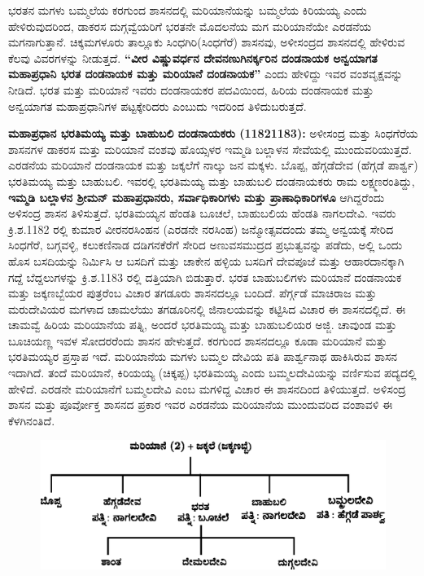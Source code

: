 ಭರತನ ಮಗಳು ಬಮ್ಮಲೆಯ ಕರಗುಂದ ಶಾಸನದಲ್ಲಿ ಮರಿಯಾನೆಯನ್ನು ಬಮ್ಮಲೆಯ ಕಿರಿಯಯ್ಯ ಎಂದು ಹೇಳಿರುವುದರಿಂದ, ಡಾಕರಸ ದುಗ್ಗವ್ವೆಯರಿಗೆ ಭರತನೇ ಮೊದಲನೆಯ ಮಗ ಮರಿಯಾನೆಯೇ ಎರಡನೆಯ ಮಗನಾಗುತ್ತಾನೆ. ಚಿಕ್ಕಮಗಳೂರು ತಾಲ್ಲೂಕು ಸಿಂಧಗಿರಿ(ಸಿಂಧಗೆರೆ) ಶಾಸನವು, ಅಳೀಸಂದ್ರದ ಶಾಸನದಲ್ಲಿ ಹೇಳಿರುವ ಕೆಲವು ವಿವರಗಳನ್ನು ನೀಡುತ್ತದೆ. \textbf{“ವೀರ ವಿಷ್ಣುವರ್ಧನ ದೇವನಣುಗಿನರ್ಕ್ಕರಿನ ದಂಡನಾಯಕ ಅನ್ವಯಾಗತ ಮಹಾಪ್ರಧಾನಿ ಭರತ ದಂಡನಾಯಕ ಮತ್ತು ಮರಿಯಾನೆ ದಂಡನಾಯಕ”} ಎಂದು ಹೇಳಿದ್ದು ಇವರ ವಂಶವೃಕ್ಷವನ್ನು ನೀಡಿದೆ. ಭರತ ಮತ್ತು ಮರಿಯಾನೆ ಇವರು ದಂಡನಾಯಕರ ಪದವಿಯಿಂದ, ಹಿರಿಯ ದಂಡನಾಯಕ ಮತ್ತು ಅನ್ವಯಾಗತ ಮಹಾಪ್ರಧಾನಿಗಳ ಪಟ್ಟಕ್ಕೇರಿದರು ಎಂಬುದು ಇದರಿಂದ ತಿಳಿದುಬರುತ್ತದೆ.

\textbf{ಮಹಾಪ್ರಧಾನ ಭರತಿಮಯ್ಯ ಮತ್ತು ಬಾಹುಬಲಿ ದಂಡನಾಯಕರು (1182\general{\enginline{-}}1183): }ಅಳೀಸಂದ್ರ ಮತ್ತು ಸಿಂಧಗೆರೆಯ ಶಾಸನಗಳ ಡಾಕರಸ ಮತ್ತು ಮರಿಯಾನೆ ವಂಶವು ಹೊಯ್ಸಳರ ಇಮ್ಮಡಿ ಬಲ್ಲಾಳನ ಸೇವೆಯಲ್ಲಿ ಮುಂದುವರಿ\-ಯುತ್ತದೆ. ಎರಡನೆಯ ಮರಿಯಾನೆ ದಂಡನಾಯಕ ಮತ್ತು ಜಕ್ಕಲೆಗೆ ನಾಲ್ಕು ಜನ ಮಕ್ಕಳು. ಬೊಪ್ಪ, ಹೆಗ್ಗಡೆದೇವ (ಹೆಗ್ಗಡೆ ಪಾರ್ಶ್ವ) ಭರತಿಮಯ್ಯ ಮತ್ತು ಬಾಹುಬಲಿ. ಇವರಲ್ಲಿ ಭರತಿಮಯ್ಯ ಮತ್ತು ಬಾಹುಬಲಿ ದಂಡನಾಯಕರು ರಾಮ ಲಕ್ಷ್ಮಣರಂತಿದ್ದು, \textbf{ಇಮ್ಮಡಿ ಬಲ್ಲಾಳನ ಶ‍್ರೀಮನ್​ ಮಹಾಪ್ರಧಾನರು, ಸರ್ವಾಧಿಕಾರಿಗಳು ಮತ್ತು ಪ್ರಾಣಾಧಿಕಾರಿಗಳೂ }ಆಗಿದ್ದರೆಂದು ಅಳಿಸಂದ್ರ ಶಾಸನ ತಿಳಿಸುತ್ತದೆ. ಭರತಿಮಯ್ಯನ ಹೆಂಡತಿ ಬೂಚಲೆ, ಬಾಹುಬಲಿಯ ಹೆಂಡತಿ ನಾಗಲದೇವಿ. ಇವರು ಕ್ರಿ.ಶ.1182 ರಲ್ಲಿ ಕುಮಾರ ವೀರನರಸಿಂಹನ (ಎರಡನೇ ನರಸಿಂಹ) ಜನ್ಮೋತ್ಸವದಂದು ತಮ್ಮ ಅನ್ವಯಕ್ಕೆ ಸೇರಿದ ಸಿಂಧಗೆರೆ, ಬಗ್ಗವಳ್ಳಿ, ಕಲುಕಣಿನಾಡ ದಡಿಗನಕೆರೆಗೆ ಸೇರಿದ ಅಣುವಸಮುದ್ರದ ಪ್ರಭುತ್ವವನ್ನು ಪಡೆದು, ಅಲ್ಲಿ ಒಂದು ಹೊಸ ಬಸದಿಯನ್ನು ನಿರ್ಮಿಸಿ ಆ ಬಸದಿಗೆ ಮತ್ತು ಚಾಕೇನ ಹಳ್ಳಿಯ ಬಸದಿಗೆ ದೇವಪೂಜೆ ಮತ್ತು ಆಹಾರದಾನಕ್ಕಾಗಿ ಗದ್ದೆ ಬೆದ್ದಲುಗಳನ್ನು ಕ್ರಿ.ಶ.1183 ರಲ್ಲಿ ದತ್ತಿಯಾಗಿ ಬಿಡುತ್ತಾರೆ. ಭರತ ಬಾಹುಬಲಿಗಳು ಮರಿಯಾನೆ ದಂಡನಾಯಕ ಮತ್ತು ಜಕ್ಕಣಬ್ಬೆಯರ ಪುತ್ರರೆಂಬ ವಿಚಾರ ತಗಡೂರು ಶಾಸನದಲ್ಲೂ ಬಂದಿದೆ. ಪೆರ್ಗ್ಗಡೆ ಮಾಚಿರಾಜ ಮತ್ತು ಮರುದೇವಿಯರ ಮಗಳಾದ ಚಾಮಲೆಯು ತಗಡೂರಿನಲ್ಲಿ ಜಿನಾಲಯವನ್ನು ಕಟ್ಟಿಸಿದ ವಿಚಾರ ಈ ಶಾಸನದಲ್ಲಿದೆ. ಈ ಚಾಮವ್ವೆ ಹಿರಿಯ ಮರಿಯಾನೆಯ ಪತ್ನಿ, ಅಂದರೆ ಭರತಿಮಯ್ಯ ಮತ್ತು ಬಾಹುಬಲಿಯರ ಅಜ್ಜಿ. ಚಾವುಂಡ ಮತ್ತು ಬೂಚಿಯಣ್ಣ ಇವಳ ಸೋದರರೆಂದು ಶಾಸನ ಹೇಳುತ್ತದೆ. ಕರಗುಂದ ಶಾಸನದಲ್ಲೂ ಕೂಡಾ ಮರಿಯಾನೆ ಮತ್ತು ಭರತಿಮಯ್ಯರ ಪ್ರಸ್ತಾಪ ಇದೆ. ಮರಿಯಾನೆಯ ಮಗಳು ಬಮ್ಮಲ ದೇವಿಯ ಪತಿ ಪಾರ್ಶ್ವನಾಥ ಹಾಕಿಸಿರುವ ಶಾಸನ ಇದಾಗಿದೆ. ತಂದೆ ಮರಿಯಾನೆ, ಕಿರಿಯಯ್ಯ (ಚಿಕ್ಕಪ್ಪ) ಭರತಿಮಯ್ಯ ಎಂದು ಬಮ್ಮಲದೇವಿಯನ್ನು ವರ್ಣಿಸುವ ಪದ್ಯದಲ್ಲಿ ಹೇಳಿದೆ. ಎರಡನೇ ಮರಿಯಾನೆಗೆ ಬಮ್ಮಲದೇವಿ ಎಂಬ ಮಗಳಿದ್ದ ವಿಚಾರ ಈ ಶಾಸನದಿಂದ ತಿಳಿಯುತ್ತದೆ. ಅಳಿಸಂದ್ರ ಶಾಸನ ಮತ್ತು ಪೂರ್ವೋಕ್ತ ಶಾಸನದ ಪ್ರಕಾರ ಇವರ ಎರಡನೆಯ ಮರಿಯಾನೆಯ ಮುಂದುವರಿದ ವಂಶಾವಳಿ ಈ ಕೆಳಗಿನಂತಿದೆ.

\begin{figure}[H]
\includegraphics[scale=1.15]{images/chap3/chap3fig14.jpeg}
\end{figure}


